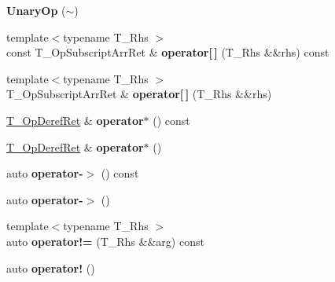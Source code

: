 \begin{DoxyCompactItemize}
{\bfseries Unary\+Op} ($\sim$)
\item 
\mbox{\label{classrlbox_1_1tainted__base__impl_ad71e3e71f23ee730d9c6a9f9fc4d557e}} 
{\footnotesize template$<$typename T\+\_\+\+Rhs $>$ }\\const T\+\_\+\+Op\+Subscript\+Arr\+Ret \& {\bfseries operator\mbox{[}$\,$\mbox{]}} (T\+\_\+\+Rhs \&\&rhs) const
\item 
\mbox{\label{classrlbox_1_1tainted__base__impl_a6fd9a75009eee8738dd0a7625bb2b1fc}} 
{\footnotesize template$<$typename T\+\_\+\+Rhs $>$ }\\T\+\_\+\+Op\+Subscript\+Arr\+Ret \& {\bfseries operator\mbox{[}$\,$\mbox{]}} (T\+\_\+\+Rhs \&\&rhs)
\item 
\mbox{\label{classrlbox_1_1tainted__base__impl_ae308e3faece4fe51254f38814220bcef}} 
\hyperlink{classrlbox_1_1tainted__volatile}{T\+\_\+\+Op\+Deref\+Ret} \& {\bfseries operator$\ast$} () const
\item 
\mbox{\label{classrlbox_1_1tainted__base__impl_a8fd7566680b44852f260d8431ee4d196}} 
\hyperlink{classrlbox_1_1tainted__volatile}{T\+\_\+\+Op\+Deref\+Ret} \& {\bfseries operator$\ast$} ()
\item 
\mbox{\label{classrlbox_1_1tainted__base__impl_a3e8fdb261d771cb7b5c9af33fe52ff35}} 
auto {\bfseries operator-\/$>$} () const
\item 
\mbox{\label{classrlbox_1_1tainted__base__impl_a52c2403f1851a0e2d295a712d8d10029}} 
auto {\bfseries operator-\/$>$} ()
\item 
\mbox{\label{classrlbox_1_1tainted__base__impl_ad22f860fd026994b29fbfe619d1cce36}} 
{\footnotesize template$<$typename T\+\_\+\+Rhs $>$ }\\auto {\bfseries operator!=} (T\+\_\+\+Rhs \&\&arg) const
\item 
\mbox{\label{classrlbox_1_1tainted__base__impl_a05eaec33cccaad9bc15e014d6c25d695}} 
auto {\bfseries operator!} ()
\item 

\end{DoxyCompactItemize}

